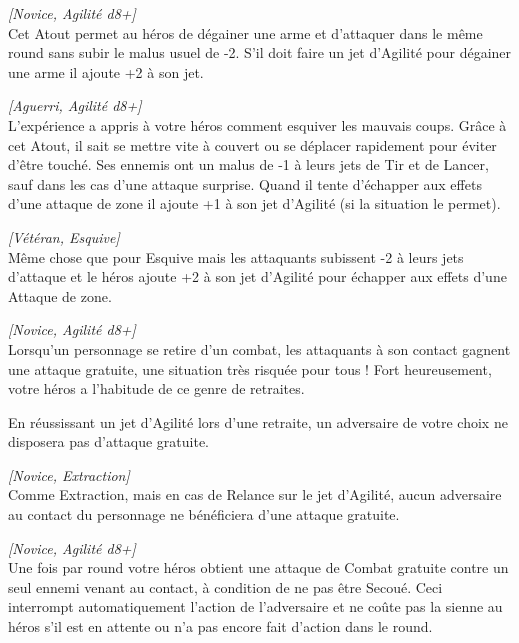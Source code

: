 \begin{description}[align=left]
    \item [Dégaine comme l’éclair]
    	\emph{[Novice, Agilité d8+]}\\
        Cet Atout permet au héros de dégainer une arme et d’attaquer dans le même round sans subir le malus usuel de -2. S’il doit faire un jet d’Agilité pour dégainer une arme il ajoute +2 à son jet.

    \item [Esquive]
    	\emph{[Aguerri, Agilité d8+]}\\
        L’expérience a appris à votre héros comment esquiver les mauvais coups. Grâce à cet Atout, il sait se mettre vite à couvert ou se déplacer rapidement pour éviter d’être touché. Ses ennemis ont un malus de -1 à leurs jets de Tir et de Lancer, sauf dans les cas d’une attaque surprise. Quand il tente d’échapper aux effets d’une attaque de zone il ajoute +1 à son jet d’Agilité (si la situation le permet).

    \item [Grande esquive]
    	\emph{[Vétéran, Esquive]}\\
        Même chose que pour Esquive mais les attaquants subissent -2 à leurs jets d’attaque et le héros ajoute +2 à son jet d’Agilité pour échapper aux effets d’une Attaque de zone.

    \item [Extraction]
    	\emph{[Novice, Agilité d8+]}\\
        Lorsqu’un personnage se retire d’un combat, les attaquants à son contact gagnent une attaque gratuite, une situation très risquée pour tous ! Fort heureusement, votre héros a l’habitude de ce genre de retraites.

		En réussissant un jet d’Agilité lors d’une retraite, un adversaire de votre choix ne disposera pas d’attaque gratuite.

    \item [Grande extraction]
    	\emph{[Novice, Extraction]}\\
        Comme Extraction, mais en cas de Relance sur le jet d’Agilité, aucun adversaire au contact du personnage ne bénéficiera d’une attaque gratuite.

    \item [Frappe éclair]
    	\emph{[Novice, Agilité d8+]}\\
        Une fois par round votre héros obtient une attaque de Combat gratuite contre un seul ennemi venant au contact, à condition de ne pas être Secoué. Ceci interrompt automatiquement l’action de l’adversaire et ne coûte pas la sienne au héros s’il est en attente ou n’a pas encore fait d’action dans le round.


\end{description}
